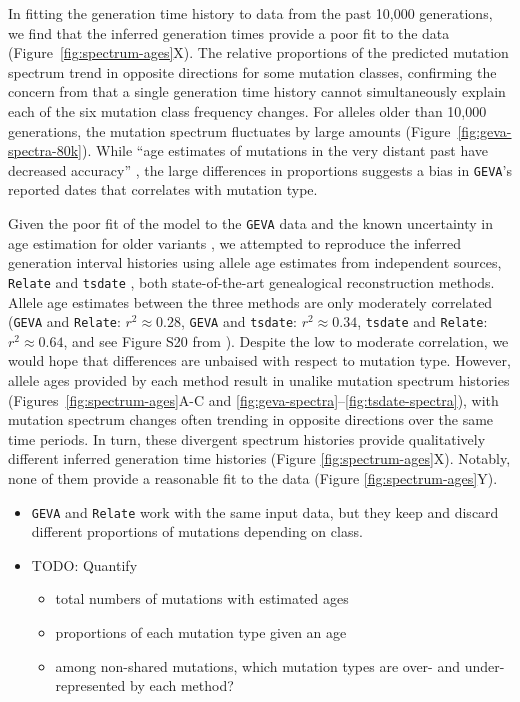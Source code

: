 \documentclass[]{article}
\newcommand{\GEVA}{\texttt{GEVA}\xspace}
\newcommand{\tsdate}{\texttt{tsdate}\xspace}
\newcommand{\relate}{\texttt{Relate}\xspace}
\begin{document}
In fitting the generation time history to data from the past 10,000
generations, we find that the inferred generation times provide a poor fit to
the data (Figure~\ref{fig:spectrum-ages}X). The relative proportions of the
predicted mutation spectrum trend in opposite directions for some mutation
classes, confirming the concern from \citet{gao2022limited} that a single
generation time history cannot simultaneously explain each of the six mutation
class frequency changes. For alleles older than 10,000 generations, the
mutation spectrum fluctuates by large amounts
(Figure~\ref{fig:geva-spectra-80k}). While ``age estimates of mutations in the
very distant past have decreased accuracy''
\citep{albers2020dating,wang2023human}, the large differences in proportions
suggests a bias in \GEVA's reported dates that correlates with mutation type.

Given the poor fit of the model to the \GEVA data and the known uncertainty in
age estimation for older variants \citep{albers2020dating}, we attempted to
reproduce the inferred generation interval histories using allele age estimates
from independent sources, \relate \citep{speidel2019method} and \tsdate
\citep{wohns2022unified}, both state-of-the-art genealogical reconstruction
methods. Allele age estimates between the three methods are only moderately
correlated (\GEVA and \relate: $r^2 \approx 0.28$, \GEVA and \tsdate: $r^2
\approx 0.34$, \tsdate and \relate: $r^2 \approx 0.64$, and see Figure S20 from
\citet{wohns2022unified}). Despite the low to moderate correlation, we would
hope that differences are unbaised with respect to mutation type. However,
allele ages provided by each method result in unalike mutation spectrum
histories (Figures~\ref{fig:spectrum-ages}A-C and
\ref{fig:geva-spectra}--\ref{fig:tsdate-spectra}), with mutation spectrum
changes often trending in opposite directions over the same time periods. In
turn, these divergent spectrum histories provide qualitatively different
inferred generation time histories (Figure \ref{fig:spectrum-ages}X). Notably,
none of them provide a reasonable fit to the data (Figure
\ref{fig:spectrum-ages}Y).

\begin{itemize}
    \item \GEVA and \relate work with the same input data, but they keep and
        discard different proportions of mutations depending on class.
    \item TODO: Quantify
        \begin{itemize}
            \item total numbers of mutations with estimated ages
            \item proportions of each mutation type given an age
            \item among non-shared mutations, which mutation types are over- and
                under-represented by each method?
        \end{itemize}
\end{itemize}
\end{document}

